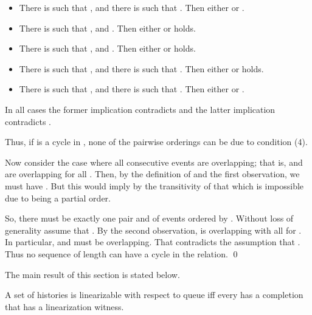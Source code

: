 \documentclass{LMCS}
\newcommand\mylabel[1]{\label{#1}}
\begin{document}
\begin{itemize}
\begin{itemize}
\item There is  such that , and there is  such that .
Then either  or .

\item There is  such that , and .
Then either  or  holds.

\item There is  such that , and .
Then either  or  holds.

\item There is  such that , and there is  such that .
Then either  or  holds.

\item There is  such that , and there is  such that .
Then either  or .

\end{itemize}
In all cases the former implication contradicts  and the latter implication contradicts .

\end{itemize}
Thus, if  is a cycle in , none of the pairwise orderings can be due to condition (4).

Now consider the case where all consecutive events are overlapping; that is,  and  are overlapping for all .
Then, by the definition of  and the first observation, we must have .
But this would imply by the transitivity of  that  which is impossible due to  being a partial order.

So, there must be exactly one pair  and  of events ordered by .
Without loss of generality assume that .
By the second observation,  is overlapping with all  for .
In particular,  and  must be overlapping.
That contradicts the assumption that . 
Thus no sequence of length  can have a cycle in the  relation.
\qed


The main result of this section is stated below.
\begin{thm}\mylabel{thm:witness}
A set of histories  is linearizable with respect to queue iff every  has a completion
 that has a linearization witness.
\end{thm}
\newpage

\proof\hfill
\end{document}
